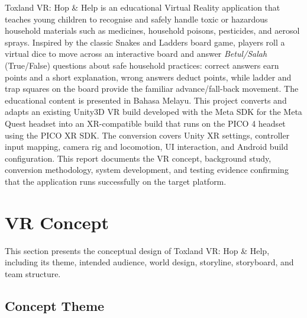 \documentclass[a4paper,12pt]{article}
\begin{document}
Toxland VR: Hop \& Help is an educational Virtual Reality application that teaches young children to recognise and safely handle toxic or hazardous household materials such as medicines, household poisons, pesticides, and aerosol sprays. Inspired by the classic Snakes and Ladders board game, players roll a virtual dice to move across an interactive board and answer \emph{Betul/Salah} (True/False) questions about safe household practices: correct answers earn points and a short explanation, wrong answers deduct points, while ladder and trap squares on the board provide the familiar advance/fall-back movement. The educational content is presented in Bahasa Melayu. This project converts and adapts an existing Unity3D VR build developed with the Meta SDK for the Meta Quest headset into an XR-compatible build that runs on the PICO 4 headset using the PICO XR SDK. The conversion covers Unity XR settings, controller input mapping, camera rig and locomotion, UI interaction, and Android build configuration. This report documents the VR concept, background study, conversion methodology, system development, and testing evidence confirming that the application runs successfully on the target platform.

\clearpage
\tableofcontents
\clearpage

\section{VR Concept}

This section presents the conceptual design of Toxland VR: Hop \& Help, including its theme, intended audience, world design, storyline, storyboard, and team structure.

\subsection{Concept Theme}
\end{document}
